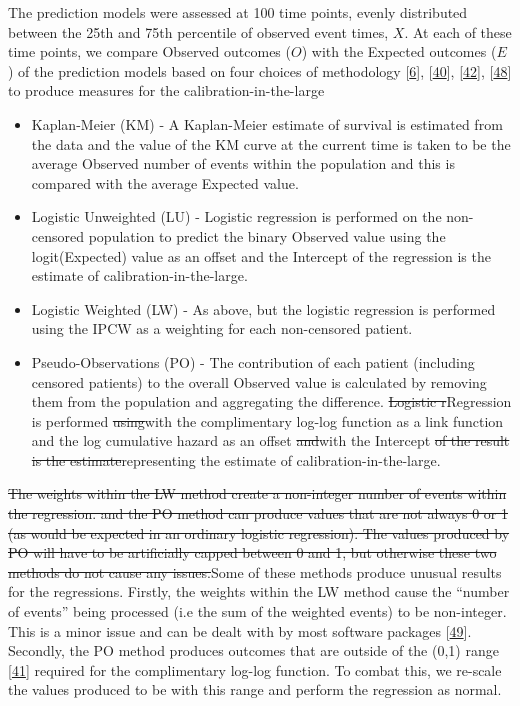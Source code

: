 \documentclass[12pt,PhD,twoside,openright]{muthesis}
\providecommand{\tightlist}{%
  \setlength{\itemsep}{0pt}\setlength{\parskip}{0pt}}
\begin{document}
The prediction models were assessed at 100 time points, evenly distributed between the 25th and 75th percentile of observed event times, \(X\). At each of these time points, we compare Observed outcomes (\(O\)) with the Expected outcomes (\(E\)) of the prediction models based on four choices of methodology {[}\protect\hyperlink{ref-riley_prognosis_2019}{6}{]}, {[}\protect\hyperlink{ref-royston_tools_2014}{40}{]}, {[}\protect\hyperlink{ref-royston_tools_2015}{42}{]}, {[}\protect\hyperlink{ref-andersen_pseudo-observations_2010}{48}{]} to produce measures for the calibration-in-the-large
\begin{itemize}
\tightlist
\item
  Kaplan-Meier (KM) - A Kaplan-Meier estimate of survival is estimated from the data and the value of the KM curve at the current time is taken to be the average Observed number of events within the population and this is compared with the average Expected value.
\item
  Logistic Unweighted (LU) - Logistic regression is performed on the non-censored population to predict the binary Observed value using the logit(Expected) value as an offset and the Intercept of the regression is the estimate of calibration-in-the-large.
\item
  Logistic Weighted (LW) - As above, but the logistic regression is performed using the IPCW as a weighting for each non-censored patient.
\item
  Pseudo-Observations (PO) - The contribution of each patient (including censored patients) to the overall Observed value is calculated by removing them from the population and aggregating the difference. \sout{Logistic r}Regression is performed \sout{using}with the complimentary log-log function as a link function and the log cumulative hazard as an offset \sout{and}with the Intercept \sout{of the result is the estimate}representing the estimate of calibration-in-the-large.
\end{itemize}
\sout{The weights within the LW method create a non-integer number of events within the regression. and the PO method can produce values that are not always 0 or 1 (as would be expected in an ordinary logistic regression). The values produced by PO will have to be artificially capped between 0 and 1, but otherwise these two methods do not cause any issues.}Some of these methods produce unusual results for the regressions. Firstly, the weights within the LW method cause the ``number of events'' being processed (i.e the sum of the weighted events) to be non-integer. This is a minor issue and can be dealt with by most software packages {[}\protect\hyperlink{ref-wildscop_biostatistics_2013}{49}{]}. Secondly, the PO method produces outcomes that are outside of the (0,1) range {[}\protect\hyperlink{ref-perme_checking_2008}{41}{]} required for the complimentary log-log function. To combat this, we re-scale the values produced to be with this range and perform the regression as normal.
\end{document}
